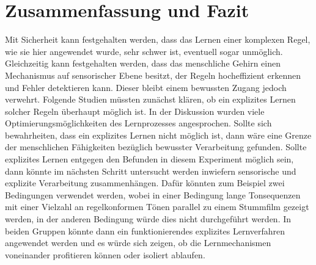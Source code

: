 \documentclass[doc,a4paper,12pt]{apa6}
\begin{document}


\section{Zusammenfassung und Fazit}

Mit Sicherheit kann festgehalten werden, dass das Lernen einer komplexen Regel, wie sie hier angewendet wurde, sehr schwer ist, eventuell sogar unmöglich. Gleichzeitig kann festgehalten werden, dass das menschliche Gehirn einen Mechanismus auf sensorischer Ebene besitzt, der Regeln hocheffizient erkennen und Fehler detektieren kann. Dieser bleibt einem bewussten Zugang jedoch verwehrt. Folgende Studien müssten zunächst klären, ob ein explizites Lernen solcher Regeln überhaupt möglich ist. In der Diskussion wurden viele Optimierungsmöglichkeiten des Lernprozesses angesprochen. Sollte sich bewahrheiten, dass ein explizites Lernen nicht möglich ist, dann wäre eine Grenze der menschlichen Fähigkeiten bezüglich bewusster Verarbeitung gefunden. Sollte explizites Lernen entgegen den Befunden in diesem Experiment möglich sein, dann könnte im nächsten Schritt untersucht werden inwiefern sensorische und explizite Verarbeitung zusammenhängen. Dafür könnten zum Beispiel zwei Bedingungen verwendet werden, wobei in einer Bedingung lange Tonsequenzen mit einer Vielzahl an regelkonformen Tönen parallel zu einem Stummfilm gezeigt werden, in der anderen Bedingung würde dies nicht durchgeführt werden. In beiden Gruppen könnte dann ein funktionierendes explizites Lernverfahren angewendet werden und es würde sich zeigen, ob die Lernmechanismen voneinander profitieren können oder isoliert ablaufen.
\end{document}
